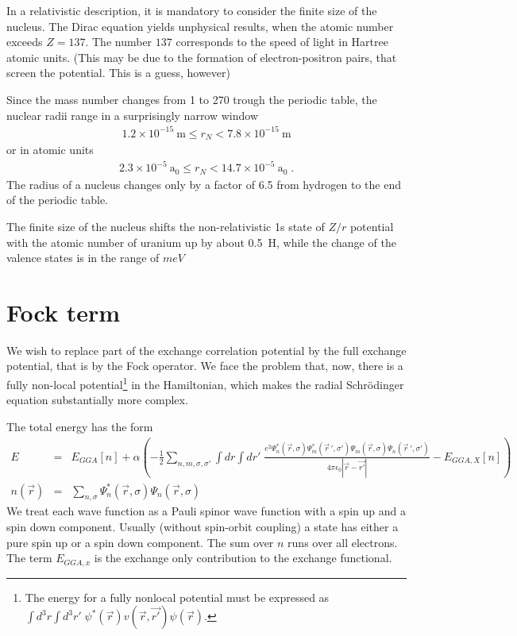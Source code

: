 \documentclass[11pt,a4paper]{report}
\begin{document}
In a relativistic description, it is mandatory to consider the finite
size of the nucleus. The Dirac equation yields unphysical
results\cite{eschrig04_inbook}, when the atomic number exceeds
$Z=137$. The number $137$ corresponds to the speed of light in Hartree
atomic units. (This may be due to the formation of electron-positron
pairs, that screen the potential. This is a guess, however)

Since the mass number changes from 1 to 270 trough the periodic table,
the nuclear radii range in a surprisingly narrow window 
\begin{eqnarray*}
1.2\times 10^{-15}~\textrm{m}\le r_N<7.8\times10^{-15}~\textrm{m}
\end{eqnarray*}
or in atomic units
\begin{eqnarray*}
2.3\times 10^{-5}~\textrm{a}_0\le r_N<14.7\times10^{-5}~\textrm{a}_0\;.
\end{eqnarray*}
The radius of a nucleus changes only by a factor of 6.5 from hydrogen
to the end of the periodic table. 

The finite size of the nucleus shifts the non-relativistic 1s state of
$Z/r$ potential with the atomic number of uranium up by about 0.5~H,
while the change of the valence states is in the range of $meV$

\section{Fock term}
We wish to replace part of the exchange correlation potential by the
full exchange potential, that is by the Fock operator. We face the
problem that, now, there is a fully non-local potential\footnote{The
  energy for a fully nonlocal potential must be expressed as $\int
  d^3r\int d^3r'\;
  \psi^*(\vec{r})v(\vec{r},\vec{r'})\psi(\vec{r})$.} in the
  Hamiltonian, which makes the radial Schr\"odinger equation
  substantially more complex.

The total energy has the form
\begin{eqnarray*}
E&=&E_{GGA}[n]+\alpha\left(-\frac{1}{2}\sum_{n,m,\sigma,\sigma'}
\int dr\int dr'\;
\frac{e^2\Psi^*_n(\vec{r},\sigma)\Psi^*_m(\vec{r}\,',\sigma')
\Psi_m(\vec{r},\sigma)\Psi_n(\vec{r}\,',\sigma')}{4\pi\epsilon_0|\vec{r}-\vec{r'}|}
-E_{GGA,X}[n]\right)
\\
n(\vec{r})&=&\sum_{n,\sigma}\Psi_n^*(\vec{r},\sigma)\Psi_n(\vec{r},\sigma)
\end{eqnarray*}
We treat each wave function as a Pauli spinor wave function
with a spin up and a spin down component. Usually (without spin-orbit
coupling) a state has either a pure spin up or a spin down component.
The sum over $n$ runs over all electrons.
The term $E_{GGA,x}$ is the exchange only contribution to the exchange
functional.
\end{document}
